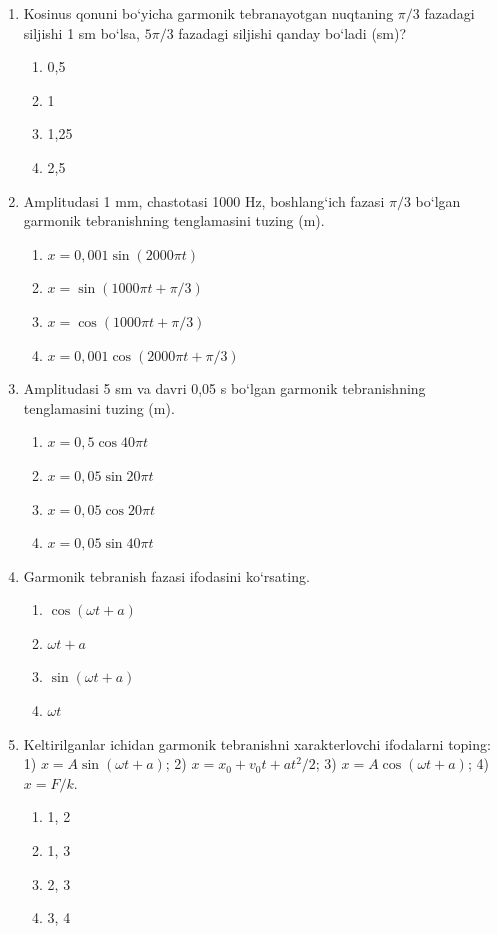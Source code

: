 \begin{enumerate}
\item Kosinus qonuni bo‘yicha garmonik tebranayotgan nuqtaning $\pi/3$ fazadagi siljishi 1 sm bo‘lsa, $5\pi/3$ fazadagi siljishi qanday bo‘ladi (sm)?
\begin{enumerate}[label=\Alph*)]
\item 0,5
\item 1
\item 1,25
\item 2,5
\end{enumerate}

\item Amplitudasi 1 mm, chastotasi 1000 Hz, boshlang‘ich fazasi $\pi/3$ bo‘lgan garmonik tebranishning tenglamasini tuzing (m).
\begin{enumerate}[label=\Alph*)]
\item $x = 0,001 \sin(2000\pi t)$
\item $x = \sin(1000\pi t + \pi/3)$
\item $x = \cos(1000\pi t + \pi/3)$
\item $x = 0,001 \cos(2000\pi t + \pi/3)$
\end{enumerate}

\item Amplitudasi 5 sm va davri 0,05 s bo‘lgan garmonik tebranishning tenglamasini tuzing (m).
\begin{enumerate}[label=\Alph*)]
\item $x = 0,5 \cos 40\pi t$
\item $x = 0,05 \sin 20\pi t$
\item $x = 0,05 \cos 20\pi t$
\item $x = 0,05 \sin 40\pi t$
\end{enumerate}

\item Garmonik tebranish fazasi ifodasini ko‘rsating.
\begin{enumerate}[label=\Alph*)]
\item $\cos(\omega t + a)$
\item $\omega t + a$
\item $\sin(\omega t + a)$
\item $\omega t$
\end{enumerate}

\item Keltirilganlar ichidan garmonik tebranishni xarakterlovchi ifodalarni toping: 1) $x = A \sin(\omega t + a)$; 2) $x = x_0 + v_0 t + at^2/2$; 3) $x = A \cos(\omega t + a)$; 4) $x = F/k$.
\begin{enumerate}[label=\Alph*)]
\item 1, 2
\item 1, 3
\item 2, 3
\item 3, 4
\end{enumerate}


\end{enumerate}
